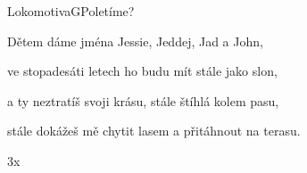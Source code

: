\begin{song}{Lokomotiva}{G}{Poletíme?}
\begin{SBChorus}

\end{SBChorus}

\begin{SBVerse}

Dětem dáme jména Jessie, Jeddej, Jad a John,

ve stopadesáti letech ho budu mít stále jako slon,

a ty neztratíš svoji krásu, stále štíhlá kolem pasu,

stále dokážeš mě chytit lasem a přitáhnout na terasu.

\end{SBVerse}

\begin{SBChorus}
3x
\end{SBChorus}

\end{song}

\clearpage
